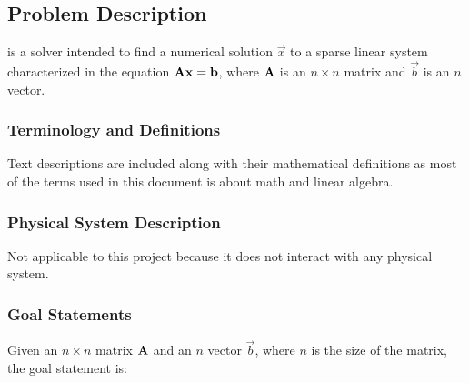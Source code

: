 \documentclass[12pt]{article}
\begin{document}
\subsection{Problem Description} \label{Sec_pd}

\progname{} is a solver intended to find a numerical solution \(\vec{x}\) to a sparse
linear system characterized in the equation \(\mathbf{A}\mathbf{x} = \mathbf{b}\), where
\(\mathbf{A}\) is an \(n \times n\) matrix and \(\vec{b}\) is an \(n\) vector.

\subsubsection{Terminology and Definitions}




Text descriptions are included along with their mathematical definitions as most
of the terms used in this document is about math and linear algebra.


\subsubsection{Physical System Description} \label{sec_phySystDescrip}

Not applicable to this project because it does not interact with any physical
system.

\subsubsection{Goal Statements}

\noindent Given an \(n \times n\) matrix \(\mathbf{A}\) and an \(n\) vector \(\vec{b}\),
where \(n\) is the size of the matrix, the goal statement is:
\end{document}
